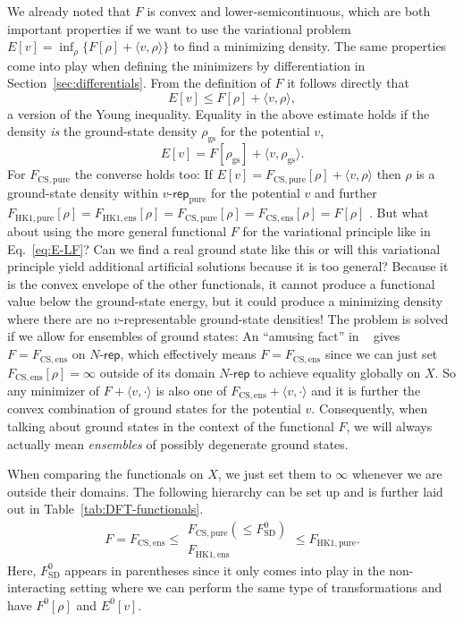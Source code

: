 \documentclass[journal=apcach,manuscript=article,layout=twocolumn]{achemso}
\newcommand{\rhogs}{{\rho_\mathrm{gs}}}
\newcommand{\FHKpure}{F_\mathrm{HK1,pure}}
\newcommand{\FHKens}{F_\mathrm{HK1,ens}}
\newcommand{\FSD}{F^0_\mathrm{SD}}
\newcommand{\FCSpure}{F_\mathrm{CS,pure}}
\newcommand{\FCSens}{F_\mathrm{CS,ens}}
\newcommand{\vrep}{\ensuremath{v\text{-}\mathsf{rep}}}
\newcommand{\vreppure}{\ensuremath{\vrep_\mathrm{pure}}}
\newcommand{\Nrep}{\ensuremath{N\text{-}\mathsf{rep}}}
\begin{document}
We already noted that $F$ is convex and lower-semicontinuous, which are both important properties if we want to use the variational problem $E[v] = \inf_\rho \{ F[\rho] + \langle v,\rho \rangle \}$ to find a minimizing density. The same properties come into play when defining the minimizers by differentiation in Section~\ref{sec:differentials}.
From the definition of $F$ it follows directly that
\begin{equation*}%
    E[v] \leq F[\rho] + \langle v,\rho \rangle,
\end{equation*}
a version of the Young inequality.
Equality in the above estimate holds if the density \emph{is} the ground-state density $\rhogs$ for the potential $v$,
\begin{equation*}%
    E[v] = F[\rhogs] + \langle v,\rhogs \rangle.
\end{equation*}
%
For $\FCSpure$ the converse holds too: If $E[v] = \FCSpure[\rho] + \langle v,\rho \rangle$ then $\rho$ is a ground-state density within $\vreppure$ for the potential $v$ and further $\FHKpure[\rho] = \FHKens[\rho] = \FCSpure[\rho] = \FCSens[\rho]=F[\rho]$ \cite[Theorem~3.10]{Lieb1983}. But what about using the more general functional $F$ for the variational principle like in Eq.~\eqref{eq:E-LF}? Can we find a real ground state like this or will this variational principle yield additional artificial solutions because it is too general? Because it is the convex envelope of the other functionals, it cannot produce a functional value below the ground-state energy, but it could produce a minimizing density where there are no $v$-representable ground-state densities!
The problem is solved if we allow for ensembles of ground states: An ``amusing fact'' in \citeauthor{Lieb1983}~\cite[Eq.~(4.5)]{Lieb1983} gives $F=\FCSens$ on $\Nrep$, which effectively means $F=\FCSens$ since we can just set $\FCSens[\rho]=\infty$ outside of its domain $\Nrep$ to achieve equality globally on $X$. So any minimizer of $F+\langle v,\cdot \rangle$ is also one of $\FCSens+\langle v,\cdot \rangle$ and it is further the convex combination of ground states for the potential $v$. Consequently, when talking about ground states in the context of the functional $F$, we will always actually mean \emph{ensembles} of possibly degenerate ground states.

When comparing the functionals on $X$, we just set them to $\infty$ whenever we are outside their domains. The following hierarchy can be set up and is further laid out in Table~\ref{tab:DFT-functionals}.
\begin{equation*}
    F = \FCSens \leq \begin{array}{c} \FCSpure (\leq \FSD) \\ \FHKens \end{array} \leq \FHKpure.
\end{equation*}
%
Here, $\FSD$ appears in parentheses since it only comes into play in the non-interacting setting where we can perform the same type of transformations and have $F^0[\rho]$ and $E^0[v]$.
\end{document}
